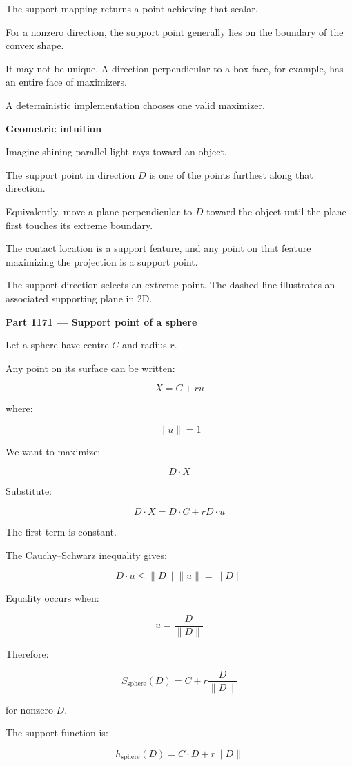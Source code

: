 The support mapping returns a point achieving that scalar.

For a nonzero direction, the support point generally lies on the boundary of the convex shape.

It may not be unique. A direction perpendicular to a box face, for example, has an entire face of maximizers.

A deterministic implementation chooses one valid maximizer.

\textbf{Geometric intuition}

Imagine shining parallel light rays toward an object.

The support point in direction \(D\) is one of the points furthest along that direction.

Equivalently, move a plane perpendicular to \(D\) toward the object until the plane first touches its extreme boundary.

The contact location is a support feature, and any point on that feature maximizing the projection is a support point.

The support direction selects an extreme point. The dashed line illustrates an associated supporting plane in 2D.

\textbf{Part 1171 --- Support point of a sphere}

Let a sphere have centre \(C\) and radius \(r\).

Any point on its surface can be written:

\[
X=C+ru
\]

where:

\[
\|u\|=1
\]

We want to maximize:

\[
D\cdot X
\]

Substitute:

\[
D\cdot X=D\cdot C+rD\cdot u
\]

The first term is constant.

The Cauchy--Schwarz inequality gives:

\[
D\cdot u\le\|D\|\|u\|=\|D\|
\]

Equality occurs when:

\[
u=\frac{D}{\|D\|}
\]

Therefore:

\[
\boxed{ S_{\mathrm{sphere}}(D)= C+r\frac{D}{\|D\|} }
\]

for nonzero \(D\).

The support function is:

\[
\boxed{ h_{\mathrm{sphere}}(D)=C\cdot D+r\|D\| }
\]

